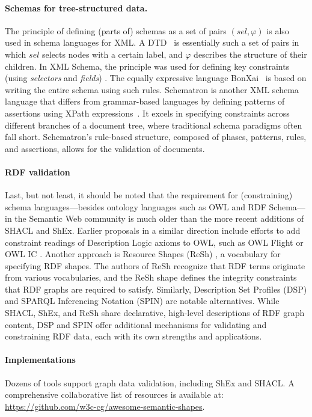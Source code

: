 \paragraph{Schemas for tree-structured data.}

The principle of defining (parts of) schemas as a set of pairs $(sel,\varphi)$ is also used in schema languages for XML. A DTD~\cite{xml} is essentially such a set of pairs in which $sel$ selects nodes with a certain label, and $\varphi$ describes the structure of their children. In XML Schema, the principle was used for defining key constraints (using \emph{selectors} and \emph{fields}) \cite[Section~3.11.1]{xsd}. The equally expressive language BonXai~\cite{MNNS17} is based on writing the entire schema using such rules. Schematron \cite{schematron} is another XML schema language that differs from grammar-based languages by defining patterns of assertions using XPath expressions~\cite{xpath}. It excels in specifying constraints across different branches of a document tree, where traditional schema paradigms often fall short. Schematron's rule-based structure, composed of phases, patterns, rules, and assertions, allows for the validation of documents.

\paragraph{RDF validation}

Last, but not least, it should be noted that the requirement for (constraining) schema languages—besides ontology languages such as OWL and RDF Schema—in the Semantic Web community is much older than the more recent additions of SHACL and ShEx. Earlier proposals in a similar direction include efforts to add constraint readings of Description Logic axioms to OWL, such as OWL Flight \cite{BRP05} or OWL IC \cite{S10}. Another approach is Resource Shapes (ReSh) \cite{R14}, a vocabulary for specifying RDF shapes. The authors of ReSh recognize that RDF terms originate from various vocabularies, and the ReSh shape defines the integrity constraints that RDF graphs are required to satisfy. Similarly, Description Set Profiles (DSP) \cite{N08} and SPARQL Inferencing Notation (SPIN) \cite{KHI11} are notable alternatives. While SHACL, ShEx, and ReSh share declarative, high-level descriptions of RDF graph content, DSP and SPIN offer additional mechanisms for validating and constraining RDF data, each with its own strengths and applications.

\paragraph{Implementations}
Dozens of tools support graph data validation, including ShEx and SHACL. A comprehensive collaborative list of resources is available at:
\url{https://github.com/w3c-cg/awesome-semantic-shapes}.